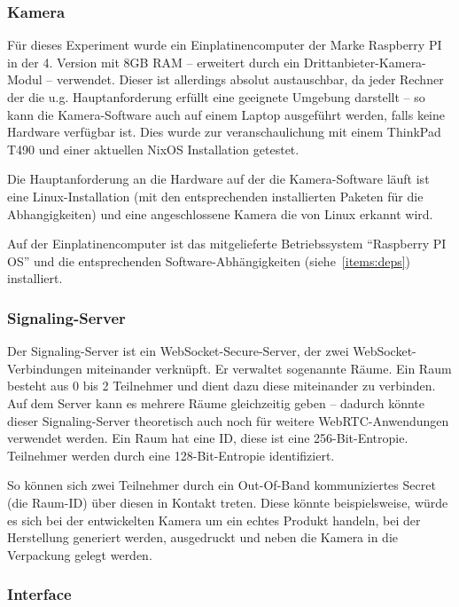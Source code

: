 \documentclass{article}
\begin{document}
\begin{onecolumn}
\subsubsection{Kamera}

Für dieses Experiment wurde ein Einplatinencomputer der Marke Raspberry PI in
der 4. Version mit 8GB RAM – erweitert durch ein Drittanbieter-Kamera-Modul –
verwendet. Dieser ist allerdings absolut austauschbar, da jeder Rechner der
die u.g. Hauptanforderung erfüllt eine geeignete Umgebung darstellt – so kann
die Kamera-Software auch auf einem Laptop ausgeführt werden, falls keine
Hardware verfügbar ist. Dies wurde zur veranschaulichung mit einem ThinkPad
T490 und einer aktuellen NixOS Installation getestet.

Die Hauptanforderung an die Hardware auf der die Kamera-Software läuft ist eine
Linux-Installation (mit den entsprechenden installierten Paketen für die
Abhangigkeiten) und eine angeschlossene Kamera die von Linux erkannt wird.

Auf der Einplatinencomputer ist das mitgelieferte Betriebssystem ``Raspberry PI
OS'' und die entsprechenden Software-Abhängigkeiten (siehe~\ref{items:deps})
installiert.

\subsubsection{Signaling-Server}

Der Signaling-Server ist ein WebSocket-Secure-Server, der zwei
WebSocket-Verbindungen miteinander verknüpft. Er verwaltet sogenannte Räume.
Ein Raum besteht aus 0 bis 2 Teilnehmer und dient dazu diese miteinander zu
verbinden. Auf dem Server kann es mehrere Räume gleichzeitig geben – dadurch
könnte dieser Signaling-Server theoretisch auch noch für weitere
WebRTC-Anwendungen verwendet werden. Ein Raum hat eine ID, diese ist eine
256-Bit-Entropie. Teilnehmer werden durch eine 128-Bit-Entropie identifiziert.

So können sich zwei Teilnehmer durch ein Out-Of-Band kommuniziertes Secret (die
Raum-ID) über diesen in Kontakt treten. Diese könnte beispielsweise, würde es
sich bei der entwickelten Kamera um ein echtes Produkt handeln, bei der
Herstellung generiert werden, ausgedruckt und neben die Kamera in die
Verpackung gelegt werden.

\subsubsection{Interface}


\end{onecolumn}
\end{document}
